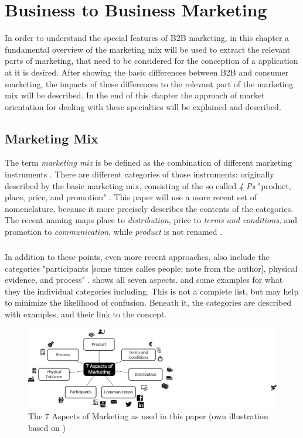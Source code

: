 \chapter{Business to Business Marketing}
In order to understand the special features of B2B marketing, in this chapter a fundamental overview of the marketing mix will be used to extract the relevant parts of marketing, that need to be considered for the conception of a application at it is desired. After showing the basic differences between B2B and consumer marketing, the impacts of these differences to the relevant part of the marketing mix will be described. In the end of this chapter the approach of market orientation for dealing with these specialties will be explained and described.
\section{Marketing Mix}
The term \textit{marketing mix} is be defined as the combination of different marketing instruments \parencite[cf.][285]{Thommen.2012}. There are  different categories of those instruments: originally described by \textcite[cf.][]{McCarthy.1993} the basic marketing mix, consisting of the so called \textit{4 Ps} "product, place, price, and promotion" . This paper will use a more recent set of nomenclature, because it more precisely describes the contents of the categories. The recent naming maps place to \textit{distribution}, price to \textit{terms and conditions}, and promotion to \textit{communication}, while \textit{product} is not renamed \parencites[285]{Thommen.2012}[cf.][397-720]{Meffert.2015}. 
\paragraph*{} In addition to these points, even more recent approaches, also include the categories "participants [some times calles people; note from the author], physical evidence, and process" \parencite{Rafiq.1995}.  shows all seven aspects.  and some examples for what they the individual categories including. This is not a complete list, but may help to minimize the likelihood of confusion. Beneath it, the categories are described with examples, and their link to the concept.

\begin{figure}[H]
	\includegraphics[width=\textwidth]{img/7p.png}
	\caption[7 Aspects of Marketing]{The 7 Aspects of Marketing as used in this paper (own illustration based on \protect\cites[285]{Thommen.2012}[397-720]{Meffert.2015}{Hoepner2015})}
	\label{fig:aspects}
\end{figure}

